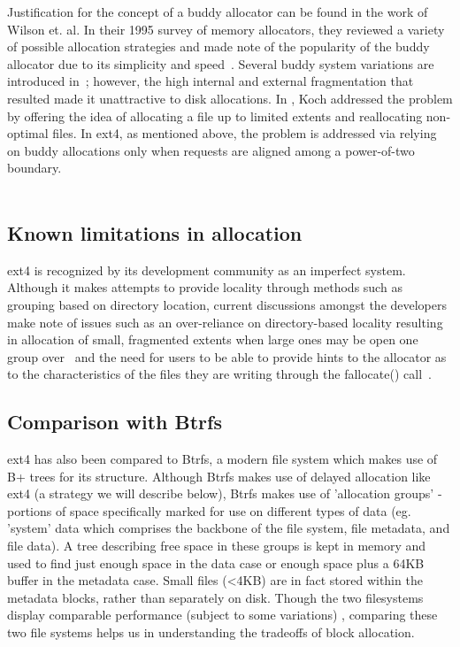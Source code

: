 \documentclass{acm_proc_article-sp}
\begin{document}
  
Justification for the concept of a buddy allocator can be found in the work of Wilson et. al.  In their 1995 survey of memory allocators, they reviewed a variety of possible allocation strategies and made note of the popularity of the buddy allocator due to its simplicity and speed~\cite{cao2008ext4}.  Several buddy system variations are introduced in~\cite{peterson1977buddy}; however, the high internal and external fragmentation that resulted made it unattractive to disk allocations. In \cite{koch1987disk}, Koch addressed the problem by offering the idea of allocating a file up to limited extents and reallocating non-optimal files. In ext4, as mentioned above, the problem is addressed via relying on buddy allocations only when requests are aligned among a power-of-two boundary.
\\
\\

\subsection{Known limitations in allocation}
ext4 is recognized by its development community as an imperfect system.  Although it makes attempts to provide locality through methods such as grouping based on directory location, current discussions amongst the developers make note of issues such as an over-reliance on directory-based locality resulting in allocation of small, fragmented extents when large ones may be open one group over~\cite{FallocateCreating} and the need for users to be able to provide hints to the allocator as to the characteristics of the files they are writing through the fallocate() call~\cite{BlockReservation}.

\subsection{Comparison with Btrfs}
ext4 has also been compared to Btrfs, a modern file system which makes use of B+ trees for its structure.  Although Btrfs makes use of delayed allocation like ext4 (a strategy we will describe below), Btrfs makes use of 'allocation groups' - portions of space specifically marked for use on different types of data (eg. 'system' data which comprises the backbone of the file system, file metadata, and file data).  A tree describing free space in these groups is kept in memory and used to find just enough space in the data case or enough space plus a 64KB buffer in the metadata case.  Small files (<4KB) are in fact stored within the metadata blocks, rather than separately on disk\cite{kara2009ext4}.  Though the two filesystems display comparable performance (subject to some variations) \cite{kebede2012performance}, comparing these two file systems helps us in understanding the tradeoffs of block allocation.
\end{document}
